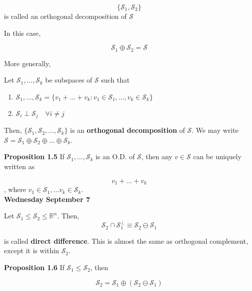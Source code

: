 \documentclass[11pt,fleqn]{book} %
\begin{document}
	$$\{\mathscr{S}_1, \mathscr{S}_2 \} $$ is called an orthogonal decomposition of $\mathscr{S}$


In this case, 

	$$\mathscr{S}_1 \oplus \mathscr{S}_2 = \mathscr{S} $$

More generally, 

\begin{definition}
	Let $\mathscr{S}_1, \dots, \mathscr{S}_k$ be subspaces of $\mathscr{S}$ such that

	\begin{enumerate}
		\item $\mathscr{S}_1, \dots, \mathscr{S}_k = \{v_1 + \dots + v_k : v_1 \in \mathscr{S}_1, \dots, v_k \in \mathscr{S}_k\}$
		\item $\mathscr{S}_i \perp \mathscr{S}_j \quad \forall i\neq j$
	\end{enumerate}
	
	Then, $\{\mathscr{S}_1, \mathscr{S}_2, \dots, \mathscr{S}_k\}$ is an \textbf{orthogonal decomposition} of $\mathscr{S}$. We may write $\mathscr{S} = \mathscr{S}_1 \oplus \mathscr{S}_2 \oplus \dots \oplus \mathscr{S}_k$.
\end{definition}

\textbf{Proposition 1.5} If $\mathscr{S}_1, \dots, \mathscr{S}_k$ is an O.D. of $\mathscr{S}$, then any $v \in \mathscr{S}$ can be uniquely written as

$$v_1 + \dots + v_k$$, where $v_1 \in \mathscr{S}_1, \dots v_k \in \mathscr{S}_k$. \\

\textbf{Wednesday September 7}

\begin{definition}
	Let $\mathscr{S}_1 \leq \mathscr{S}_2 \leq \mathbb{R}^n$. Then, \\

	$$\mathscr{S}_2 \cap \mathscr{S}_1^\perp \equiv \mathscr{S}_2 \ominus \mathscr{S}_1 $$ 

	is called \textbf{direct difference}. This is almost the same as orthogonal complement, except it is within $\mathscr{S}_2$. 

\end{definition}

\textbf{Proposition 1.6} If $\mathscr{S}_1 \leq \mathscr{S}_2$, then 

$$\mathscr{S}_2 = \mathscr{S}_1 \oplus (\mathscr{S}_2 \ominus \mathscr{S}_1) $$
\end{document}
